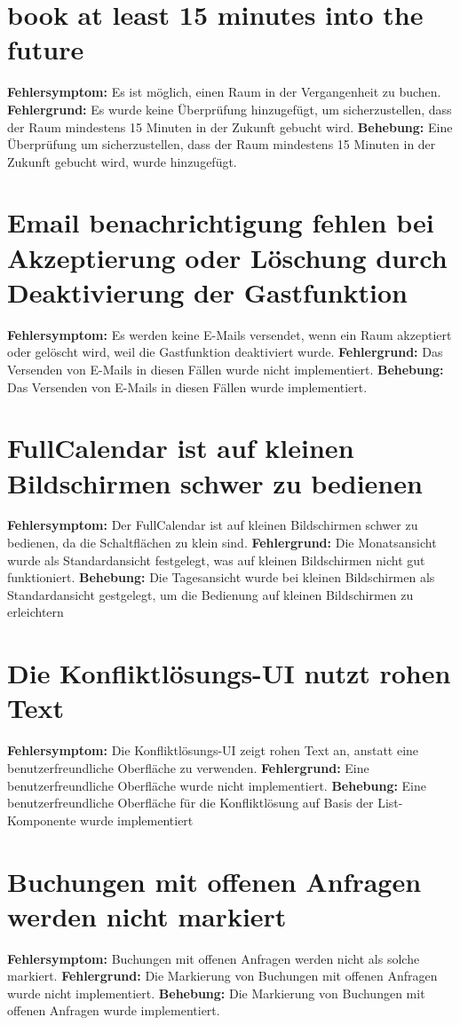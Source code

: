 \section{book at least 15 minutes into the future}
\textbf{Fehlersymptom:} Es ist möglich, einen Raum in der Vergangenheit zu buchen.
\textbf{Fehlergrund:} Es wurde keine Überprüfung hinzugefügt, um sicherzustellen, dass der Raum mindestens 15 Minuten in der Zukunft gebucht wird.
\textbf{Behebung:} Eine Überprüfung um sicherzustellen, dass der Raum mindestens 15 Minuten in der Zukunft gebucht wird, wurde hinzugefügt.

\section{Email benachrichtigung fehlen bei Akzeptierung oder Löschung durch Deaktivierung der Gastfunktion}
\textbf{Fehlersymptom:} Es werden keine E-Mails versendet, wenn ein Raum akzeptiert oder gelöscht wird, weil die Gastfunktion deaktiviert wurde.
\textbf{Fehlergrund:} Das Versenden von E-Mails in diesen Fällen wurde nicht implementiert.
\textbf{Behebung:} Das Versenden von E-Mails in diesen Fällen wurde implementiert.

\section{FullCalendar ist auf kleinen Bildschirmen schwer zu bedienen}
\textbf{Fehlersymptom:} Der FullCalendar ist auf kleinen Bildschirmen schwer zu bedienen, da die Schaltflächen zu klein sind.
\textbf{Fehlergrund:} Die Monatsansicht wurde als Standardansicht festgelegt, was auf kleinen Bildschirmen nicht gut funktioniert.
\textbf{Behebung:} Die Tagesansicht wurde bei kleinen Bildschirmen als Standardansicht gestgelegt, um die Bedienung auf kleinen Bildschirmen zu erleichtern

\section{Die Konfliktlösungs-UI nutzt rohen Text}
\textbf{Fehlersymptom:} Die Konfliktlösungs-UI zeigt rohen Text an, anstatt eine benutzerfreundliche Oberfläche zu verwenden.
\textbf{Fehlergrund:} Eine benutzerfreundliche Oberfläche wurde nicht implementiert.
\textbf{Behebung:} Eine benutzerfreundliche Oberfläche für die Konfliktlösung auf Basis der List-Komponente wurde implementiert

\section{Buchungen mit offenen Anfragen werden nicht markiert}
\textbf{Fehlersymptom:} Buchungen mit offenen Anfragen werden nicht als solche markiert.
\textbf{Fehlergrund:} Die Markierung von Buchungen mit offenen Anfragen wurde nicht implementiert.
\textbf{Behebung:} Die Markierung von Buchungen mit offenen Anfragen wurde implementiert.

